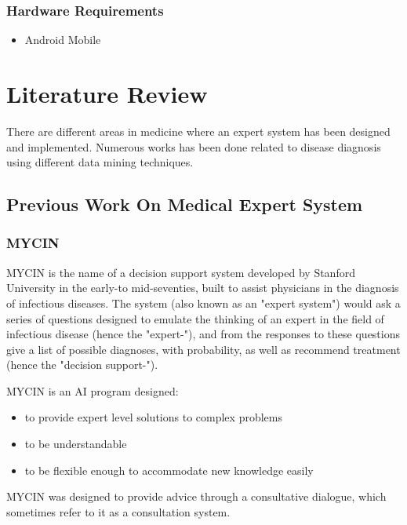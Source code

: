 \subsection{Hardware Requirements}
\begin{itemize}
    \item Android Mobile
\end{itemize}


\chapter{Literature Review}
There are different areas in medicine where an expert system has  been  designed  and  implemented. Numerous works has been done related to disease diagnosis using different data mining techniques. 


\section{Previous Work On Medical Expert System}
\subsection{MYCIN}
MYCIN is the name of a decision support system developed by Stanford University in the early-to mid-seventies, built to assist physicians in the diagnosis of infectious diseases. The system (also known as an "expert system") would ask a series of questions designed to emulate the thinking of an expert in the field of infectious disease (hence the "expert-"), and from the responses to these questions give a list of possible diagnoses, with probability, as well as recommend treatment (hence the "decision support-").\par 
MYCIN is an AI program designed:
\begin{itemize}
    \item to provide expert level solutions to complex problems
    \item to be understandable
    \item to be flexible enough to accommodate new knowledge easily
\end{itemize}
MYCIN was designed to provide advice through a consultative dialogue, which sometimes refer to it as a consultation system.

